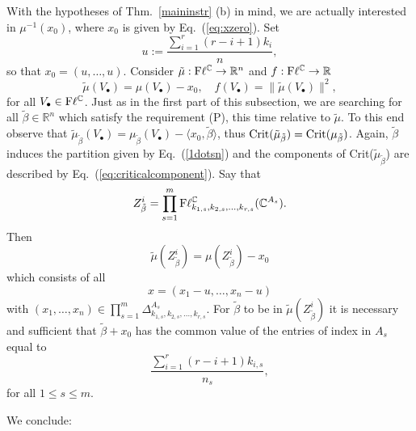 \documentclass[12pt]{amsart}
\theoremstyle{definition}
\theoremstyle{remark}
\newcommand{\RR}{\mathbb R}
\newcommand{\CC}{\mathbb C}
\newcommand{\bet}{\tilde{\beta}}
\begin{document}
With the hypotheses of Thm.~\ref{maininstr} (b) in mind, we are actually interested in $\mu^{-1}(x_0)$, where $x_0$ is given by Eq.~(\ref{eq:xzero}). Set
 $$u:=\frac{\sum_{i=1}^r (r-i+1)k_i}{n},$$
 so that $x_0=(u, \ldots, u).$ Consider
  $\tilde{\mu} : {\rm F}\ell^\CC \to {\mathbb R}^n$ and  $f : {\rm F}\ell^\CC \to \RR$ 
  $$\tilde{\mu}(V_\bullet)=\mu(V_\bullet)-x_0,\quad f(V_\bullet) = \|\tilde{\mu}(V_\bullet)\|^2 ,$$ for all $V_\bullet \in {\rm F}\ell^\CC$.   Just as in the first part of this subsection, we are searching for all $\bet \in \RR^n$  which satisfy the requirement (P), this time relative to $\tilde{\mu}$. To this end observe that $\tilde{\mu}_{\bet}(V_\bullet)=\mu_{\bet}(V_\bullet)-\langle x_0, \bet\rangle$, thus ${\rm Crit}(\tilde{\mu}_{\bet})={\rm Crit}({\mu}_{\bet})$.
  Again, $\tilde{\beta}$ induces the partition given by Eq.~(\ref{1dotsn}) and the components of Crit($\tilde{\mu}_{\tilde{\beta}}$) are described by Eq.~(\ref{eq:criticalcomponent}). Say that 
$$Z_{\bet}^i=\prod_{s=1}^m {\rm F}\ell^\CC_{k_{1,s}, k_{2,s}, \ldots, k_{r,s}}(\CC^{A_s}).$$
Then 
$$\tilde{\mu}(Z_{\bet}^i)={\mu}(Z_{\bet}^i)-x_0$$
which consists of all
$$x=\left(x_1-u, \ldots,  x_n-u\right)$$
 with $(x_1, \ldots, x_n)\in \prod_{s=1}^m \Delta^{A_s}_{k_{1,s}, k_{2,s}, \ldots, k_{r,s}}$. 
 For $\tilde{\beta}$ to be in $\tilde{\mu}(Z_{\tilde{\beta}}^i)$ it is necessary and sufficient that $\tilde{\beta}+x_0$ has the common value of the entries of index in $A_s$  equal to  
 $$\frac{\sum_{i=1}^r(r-i+1) k_{i, s}}{n_s},$$
for all $1\le s\le m$. 



We conclude:
\end{document}
